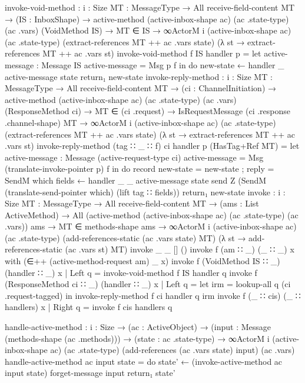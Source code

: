 \begin{code}
    invoke-void-method : {i : Size} {MT : MessageType} →
             All receive-field-content MT →
             (IS : InboxShape) →
             active-method (active-inbox-shape ac) (ac .state-type) (ac .vars) (VoidMethod IS) →
             MT ∈ IS →
             ∞ActorM i (active-inbox-shape ac) (ac .state-type) (extract-references MT ++ ac .vars state) (λ st → extract-references MT ++ ac .vars st)
    invoke-void-method f IS handler p =
      let
        active-message : Message IS
        active-message = Msg p f
      in do
        new-state ← handler _ active-message state
        return₁ new-state
    invoke-reply-method : {i : Size} {MT : MessageType} →
              All receive-field-content MT →
              (ci : ChannelInitiation) →
              active-method (active-inbox-shape ac) (ac .state-type) (ac .vars) (ResponseMethod ci) →
              MT ∈ (ci .request) →
              IsRequestMessage (ci .response .channel-shape) MT →
              ∞ActorM i (active-inbox-shape ac) (ac .state-type) (extract-references MT ++ ac .vars state) (λ st → extract-references MT ++ ac .vars st)
    invoke-reply-method (tag ∷ _ ∷ f) ci handler p (HasTag+Ref MT) =
      let
        active-message : Message (active-request-type ci)
        active-message = Msg (translate-invoke-pointer p) f
      in do
        record { new-state = new-state ; reply = SendM which fields } ← handler _ _ active-message state
        send Z (SendM (translate-send-pointer which) (lift tag ∷ fields))
        return₁ new-state
    invoke : {i : Size} {MT : MessageType} →
             All receive-field-content MT →
             (ams : List ActiveMethod) →
             All (active-method (active-inbox-shape ac) (ac .state-type) (ac .vars)) ams →
             MT ∈ methods-shape ams →
             ∞ActorM i (active-inbox-shape ac)
                       (ac .state-type)
                       (add-references-static (ac .vars state) MT)
                       (λ st → add-references-static (ac .vars st) MT)
    invoke _ _ [] ()
    invoke f (am ∷ _) (_ ∷ _) x with (∈++ (active-method-request am) _ x)
    invoke f (VoidMethod IS ∷ _) (handler ∷ _) x | Left q = invoke-void-method f IS handler q
    invoke f (ResponseMethod ci ∷ _) (handler ∷ _) x | Left q =
      let irm = lookup-all q (ci .request-tagged)
      in invoke-reply-method f ci handler q irm
    invoke f (_ ∷ cis) (_ ∷ handlers) x | Right q = invoke f cis handlers q


handle-active-method : {i : Size} →
                       (ac : ActiveObject) →
                       (input : Message (methods-shape (ac .methods))) →
                       (state : ac .state-type) →
                       ∞ActorM i (active-inbox-shape ac)
                         (ac .state-type) (add-references (ac .vars state) input) (ac .vars)
handle-active-method ac input state =
  do
    state' ← (invoke-active-method ac input state)
    forget-message input
    return₁ state'


\end{code}
